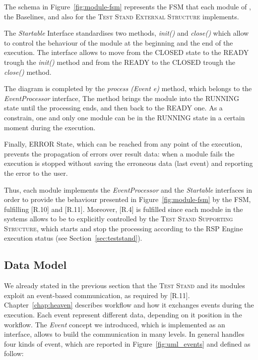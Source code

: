 The schema in Figure~\ref{fig:module-fsm} represents the FSM that each module of \namens, the Baselines, and also for the \textsc{Test Stand External Structure} implements. 

The \textit{Startable} Interface standardises two methods, \textit{init()} and \textit{close()} which allow to control the behaviour of the module at the beginning and the end of the execution. The interface allows to move from the CLOSED state to the READY trough the \textit{init()} method and from the READY to the CLOSED trough the \textit{close()} method. 

The diagram is completed by the \textit{process (Event e)} method, which belongs to the \textit{EventProcessor} interface, The method brings the module into the RUNNING state until the processing ends, and then back to the READY one. As a constrain, one and only one module can be in the RUNNING state in a certain moment during the execution.

Finally, ERROR State, which can be reached from any point of the execution, prevents the propagation of errors over result data: when a module fails the execution is stopped without saving the erroneous data (last event) and reporting the error to the user.

Thus, each \name module implements the \textit{EventProcessor} and the \textit{Startable} interfaces in order to provide the behaviour presented in Figure~\ref{fig:module-fsm} by the FSM, fulfilling [R.10] and [R.11]. Moreover,  [R.4] is fulfilled since each module in the systems allows to be to explicitly controlled by the \textsc{Test Stand Supporting Structure}, which starts and stop the processing according to the RSP Engine execution status (see Section~\ref{sec:teststand}). 

\pagebreak

\subsection{Data Model}\label{sec:data-impl}

We already stated in the previous section that the \textsc{Test Stand} and its modules exploit an event-based communication, as required by [R.11]. Chapter~\ref{chap:heaven} describes \name workflow and how it exchanges events during the execution. Each event represent different data, depending on it position in the workflow. The \textit{Event} concept we introduced, which is implemented as an interface, allows to build the communication in many levels. In general \name handles four kinds of event, which are reported in Figure~\ref{fig:uml_events} and defined as follow:

